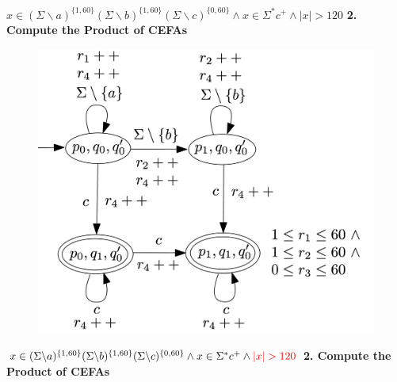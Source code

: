 \documentclass[landscape]{beamer}
\begin{document}
\begin{frame}{$ x\in (\Sigma \backslash a)^{\{1,60\}}(\Sigma \backslash b)^{\{1,60\}}(\Sigma \backslash c)^{\{0,60\}} \wedge x\in \Sigma^*c^+ \wedge |x| > 120$}
  \textbf{2. Compute the Product of CEFAs }
  \begin{figure}
    \includegraphics[width=.65\linewidth]{overview_product.jpg}
  \end{figure}
\end{frame}
\begin{frame}{$ x\in (\Sigma \backslash a)^{\{1,60\}}(\Sigma \backslash b)^{\{1,60\}}(\Sigma \backslash c)^{\{0,60\}} \wedge x\in \Sigma^*c^+ \wedge \textcolor{red}{|x| > 120}$}
  \textbf{2. Compute the Product of CEFAs }
\end{frame}
\end{document}
